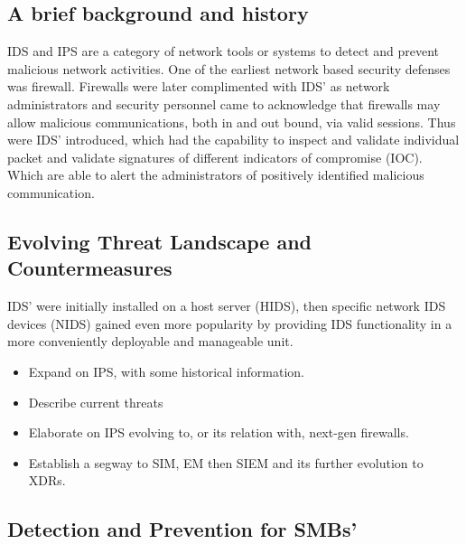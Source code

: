 
\subsection{A brief background and history}

IDS and IPS are a category of network tools or systems to detect and prevent malicious network activities. One of the earliest network based security defenses was firewall. Firewalls were later complimented with IDS' as network administrators and security personnel came to acknowledge that firewalls may allow malicious  communications, both in and out bound, via valid sessions. Thus were IDS' introduced, which had the capability to inspect and validate individual packet and validate signatures of different indicators of compromise (IOC). Which are able to alert the administrators of positively identified malicious communication.

\subsection{Evolving Threat Landscape and Countermeasures}

IDS' were initially installed on a host server (HIDS), then specific network IDS devices (NIDS) gained even more popularity by providing IDS functionality in a more conveniently deployable and manageable unit.

\begin{followup}[to-do]
    \begin{itemize}
        \item Expand on IPS, with some historical information.
        \item Describe current threats
        \item Elaborate on IPS evolving to, or its relation with, next-gen firewalls.
        \item Establish a segway to SIM, EM then SIEM and its further evolution to XDRs.
    \end{itemize}
\end{followup}

\subsection{Detection and Prevention for SMBs'}


